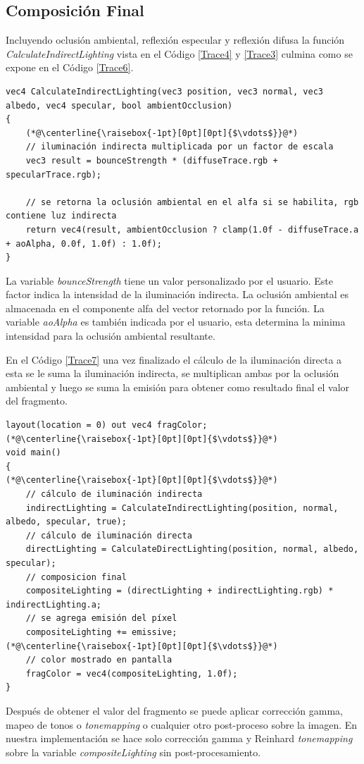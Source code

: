 \subsection{Composición Final} %
\label{sub:composicion_final}
Incluyendo oclusión ambiental, reflexión especular y reflexión difusa la función \emph{CalculateIndirectLighting} vista en el Código \ref{Trace4} y \ref{Trace3} culmina como se expone en el Código \ref{Trace6}.
\\
\begin{lstlisting}[caption={Composición para la iluminación indirecta.}, label=Trace6]
vec4 CalculateIndirectLighting(vec3 position, vec3 normal, vec3 albedo, vec4 specular, bool ambientOcclusion)
{
    (*@\centerline{\raisebox{-1pt}[0pt][0pt]{$\vdots$}}@*)
    // iluminación indirecta multiplicada por un factor de escala
    vec3 result = bounceStrength * (diffuseTrace.rgb + specularTrace.rgb);

    // se retorna la oclusión ambiental en el alfa si se habilita, rgb contiene luz indirecta
    return vec4(result, ambientOcclusion ? clamp(1.0f - diffuseTrace.a + aoAlpha, 0.0f, 1.0f) : 1.0f);
}
\end{lstlisting}

La variable \emph{bounceStrength} tiene un valor personalizado por el usuario. Este factor indica la intensidad de la iluminación indirecta. La oclusión ambiental es almacenada en el componente alfa del vector retornado por la función. La variable \emph{aoAlpha} es también indicada por el usuario, esta determina la minima intensidad para la oclusión ambiental resultante.

En el Código \ref{Trace7} una vez finalizado el cálculo de la iluminación directa a esta se le suma la iluminación indirecta, se multiplican ambas por la oclusión ambiental y luego se suma la emisión para obtener como resultado final el valor del fragmento.
\\
\begin{lstlisting}[caption={Composición final de imagen.}, label=Trace7]
layout(location = 0) out vec4 fragColor;
(*@\centerline{\raisebox{-1pt}[0pt][0pt]{$\vdots$}}@*)
void main()
{
(*@\centerline{\raisebox{-1pt}[0pt][0pt]{$\vdots$}}@*)
    // cálculo de iluminación indirecta
    indirectLighting = CalculateIndirectLighting(position, normal, albedo, specular, true);
    // cálculo de iluminación directa
    directLighting = CalculateDirectLighting(position, normal, albedo, specular);
    // composicion final 
    compositeLighting = (directLighting + indirectLighting.rgb) * indirectLighting.a;
    // se agrega emisión del píxel
    compositeLighting += emissive;
(*@\centerline{\raisebox{-1pt}[0pt][0pt]{$\vdots$}}@*)
    // color mostrado en pantalla
    fragColor = vec4(compositeLighting, 1.0f);
}
\end{lstlisting}

Después de obtener el valor del fragmento se puede aplicar corrección gamma, mapeo de tonos o \emph{tonemapping} o cualquier otro post-proceso sobre la imagen. En nuestra implementación se hace solo corrección gamma y Reinhard \emph{tonemapping} \cite{Reinhard:2002:PTR:566570.566575} sobre la variable \emph{compositeLighting} sin post-procesamiento.
